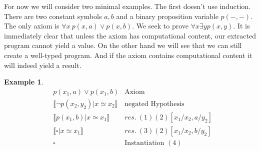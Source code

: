 \documentclass[onehalfspacing]{article}
\newtheorem{example}[theorem]{Example}
\newcommand{\llb}{\llbracket}
\newcommand{\rrb}{\rrbracket}
\begin{document}
For now we will consider two minimal examples. The first doesn't use induction. There are two constant symbols $a, b$ and a binary proposition variable $p(-, -)$. The only axiom is $\forall x\:p(x,a)\vee p(x, b)$. We seek to prove $\forall x\exists y p(x, y)$. It is immediately clear that unless the axiom has computational content, our extracted program cannot yield a value. On the other hand we will see that we can still create a well-typed program. And if the axiom contains computational content it will indeed yield a result.




\begin{example}\hfill
	\begin{align}
		& p(x_1,a)\vee p(x_1, b) & \text{Axiom}\\
		& \llb \neg p(x_2, y_2) | x\simeq x_2\rrb & \text{negated Hypothesis}\\
		& \llb p(x_1, b) | x\simeq x_1\rrb & res.\:(1) (2) [x_1/x_2, a/y_2]\\
		& \llb \square | x\simeq x_1\rrb & res.\:(3) (2) [x_1/x_2, b/y_2]\\
		& \square &\text{Instantiation }(4)
	\end{align}
\end{example}
\end{document}
